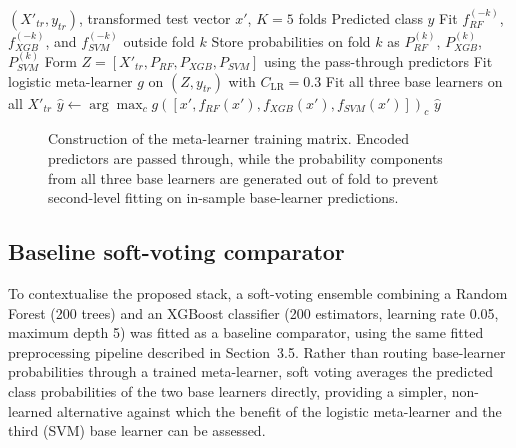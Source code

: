 \documentclass{elektr}
\begin{document}
\begin{algorithm}[H]
\caption{Leakage-controlled out-of-fold stacking and held-out inference}
\label{alg:stack}
\small
\begin{algorithmic}[1]
\Require $(X'_{tr},y_{tr})$, transformed test vector $x'$, $K=5$ folds
\Ensure Predicted class $\hat y$
\State Fit $f_{RF}^{(-k)}$, $f_{XGB}^{(-k)}$, and $f_{SVM}^{(-k)}$ outside fold $k$
\State Store probabilities on fold $k$ as $P_{RF}^{(k)}$, $P_{XGB}^{(k)}$, $P_{SVM}^{(k)}$
\EndFor
\State Form $Z=[X'_{tr},P_{RF},P_{XGB},P_{SVM}]$ using the pass-through predictors
\State Fit logistic meta-learner $g$ on $(Z,y_{tr})$ with $C_{\mathrm{LR}}=0.3$
\State Fit all three base learners on all $X'_{tr}$
\State $\hat y\gets\arg\max_c g([x',f_{RF}(x'),f_{XGB}(x'),f_{SVM}(x')])_c$
\State \Return $\hat y$
\end{algorithmic}
\end{algorithm}

\begin{figure}[H]
\centering
{}
\caption{Construction of the meta-learner training matrix. Encoded predictors are passed through, while the probability components from all three base learners are generated out of fold to prevent second-level fitting on in-sample base-learner predictions.}
\label{fig:oof}
\end{figure}

\FloatBarrier

\subsection{Baseline soft-voting comparator}
To contextualise the proposed stack, a soft-voting ensemble combining a Random Forest (200 trees) and an XGBoost classifier (200 estimators, learning rate 0.05, maximum depth 5) was fitted as a baseline comparator, using the same fitted preprocessing pipeline described in Section~3.5. Rather than routing base-learner probabilities through a trained meta-learner, soft voting averages the predicted class probabilities of the two base learners directly, providing a simpler, non-learned alternative against which the benefit of the logistic meta-learner and the third (SVM) base learner can be assessed.
\end{document}
